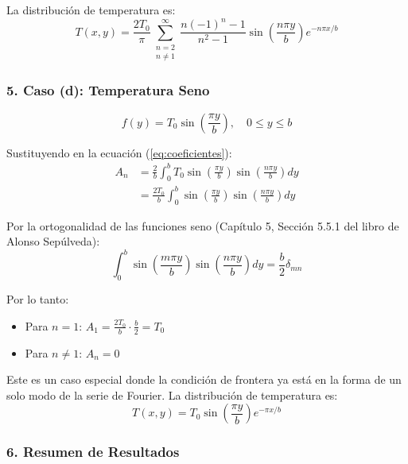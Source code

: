 \documentclass[a4paper]{article}
\begin{document}
La distribución de temperatura es:
\begin{equation}
\boxed{T(x, y) = \frac{2T_0}{\pi} \sum_{\substack{n=2 \\ n \neq 1}}^{\infty} \frac{n(-1)^n - 1}{n^2 - 1} \sin\left(\frac{n\pi y}{b}\right) e^{-n\pi x/b}}
\end{equation}

\subsubsection{5. Caso (d): Temperatura Seno}

\begin{equation}
f(y) = T_0 \sin\left(\frac{\pi y}{b}\right), \quad 0 \leq y \leq b
\end{equation}

Sustituyendo en la ecuación (\ref{eq:coeficientes}):
\begin{align}
A_n &= \frac{2}{b} \int_0^b T_0 \sin\left(\frac{\pi y}{b}\right) \sin\left(\frac{n\pi y}{b}\right) dy \\
&= \frac{2T_0}{b} \int_0^b \sin\left(\frac{\pi y}{b}\right) \sin\left(\frac{n\pi y}{b}\right) dy
\end{align}

Por la ortogonalidad de las funciones seno (Capítulo 5, Sección 5.5.1 del libro de Alonso Sepúlveda):
\begin{equation}
\int_0^b \sin\left(\frac{m\pi y}{b}\right) \sin\left(\frac{n\pi y}{b}\right) dy = \frac{b}{2} \delta_{mn}
\end{equation}

Por lo tanto:
\begin{itemize}
    \item Para $n = 1$: $A_1 = \frac{2T_0}{b} \cdot \frac{b}{2} = T_0$
    \item Para $n \neq 1$: $A_n = 0$
\end{itemize}

Este es un caso especial donde la condición de frontera ya está en la forma de un solo modo de la serie de Fourier. La distribución de temperatura es:
\begin{equation}
\boxed{T(x, y) = T_0 \sin\left(\frac{\pi y}{b}\right) e^{-\pi x/b}}
\end{equation}

\subsubsection{6. Resumen de Resultados}
\end{document}
